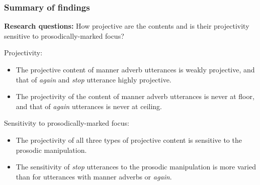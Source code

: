 \documentclass[pdf,xcolor=table,envcountsect,handout]{beamer}
\begin{document}
\begin{frame}
\frametitle{Summary of findings}

{\bf Research questions:} How projective are the contents and is their projectivity sensitive to prosodically-marked focus?

\pause
Projectivity:

\begin{itemize}[leftmargin=2ex,topsep=-1ex]

\item The projective content of manner adverb utterances is weakly projective, and that of {\em again} and {\em stop} utterance highly projective.

\item The projectivity of the content of manner adverb utterances is never at floor, and that of {\em again} utterances is never at ceiling. 

\end{itemize}

\pause

\medskip
Sensitivity to prosodically-marked focus:

\begin{itemize}[leftmargin=2ex,topsep=-1ex]

\item The projectivity of all three types of projective content is sensitive to the prosodic manipulation.

\item The sensitivity of {\em stop} utterances to the prosodic manipulation is more varied than for utterances with manner adverbs or {\em again}.


\end{itemize}


\end{frame}
\end{document}
